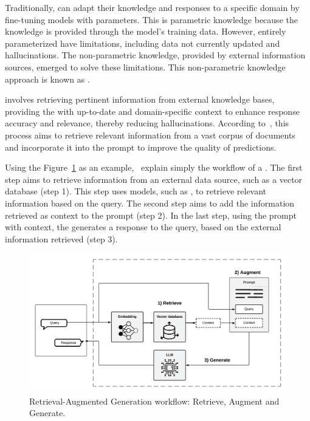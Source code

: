 Traditionally, {\llm} can adapt their knowledge and responses to a specific domain by fine-tuning models with parameters. This is parametric knowledge because the {\llm} knowledge is provided through the model's training data. However, entirely parameterized {\llm} have limitations, including data not currently updated and hallucinations. The non-parametric knowledge, provided by external information sources, emerged to solve these limitations. This non-parametric knowledge approach is known as {\rag}. 

{\rag} involves retrieving pertinent information from external knowledge bases, providing the {\llm} with up-to-date and domain-specific context to enhance response accuracy and relevance, thereby reducing hallucinations. According to~\citet{lewis_retrieval-augmented_2020}, this process aims to retrieve relevant information from a vast corpus of documents and incorporate it into the prompt to improve the quality of predictions.

Using the Figure~\ref{fig_rag} as an example,~\citet{gao_retrieval-augmented_2023} explain simply the workflow of a {\rag}. The first step aims to retrieve information from an external data source, such as a vector database (step 1). This step uses {\ir} models, such as {\bm}, to retrieve relevant information based on the query. The second step aims to add the information retrieved as context to the {\llm} prompt (step 2). In the last step, using the prompt with context, the {\llm} generates a response to the query, based on the external information retrieved (step 3).


\begin{figure}[ht]
    \includegraphics[width=\textwidth]{figs/chapter2/rag_workflow.png}
    \centering
    \caption[Retrieval-Augmented Generation workflow]{Retrieval-Augmented Generation workflow: Retrieve, Augment and Generate.}
    \label{fig_rag}
\end{figure}


